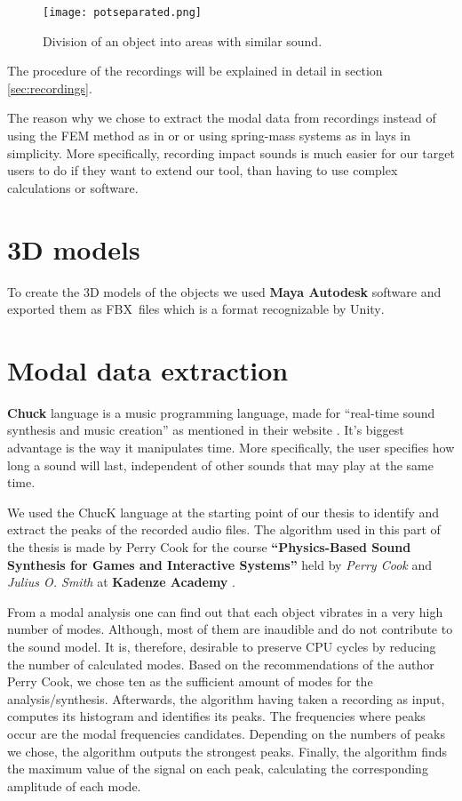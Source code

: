\begin{figure}[H]
  \centering
    \texttt{[image: potseparated.png]}
      \caption{Division of an object into areas with similar sound.}
      \label{fig:pot_sep}
\end{figure} 

The procedure of the recordings will be explained in detail in section \ref{sec:recordings}.

The reason why we chose to extract the modal data from recordings instead of using the FEM method as in \cite{director2001synthesizing} or \cite{o2002synthesizing} or using spring-mass systems as in \cite{raghuvanshi2006interactive} lays in simplicity. More specifically, recording impact sounds is much easier for our target users to do if they want to extend our tool, than having to use complex calculations or software.

\section{3D models}
To create the 3D models of the objects we used \textbf{Maya Autodesk} software \cite{bib:maya} and exported them as FBX\textsuperscript\textregistered\ files \cite{bib:fbx} which is a format recognizable by Unity\textsuperscript{\textregistered}.


\section{Modal data extraction}\label{sec:chuck}
\textbf{Chuck} language is a music programming language, made for ``real-time sound synthesis and music creation'' as mentioned in their website \cite{bib:chuck}. It's biggest advantage is the way it manipulates time. More specifically, the user specifies how long a sound will last, independent of other sounds that may play at the same time.

We used the ChucK language at the starting point of our thesis to identify and extract the peaks of the recorded audio files. The algorithm used in this part of the thesis is made by Perry Cook for the course \textbf{``Physics-Based Sound Synthesis for Games and Interactive Systems''} held by \textit{Perry Cook} and \textit{Julius O. Smith} at \textbf{Kadenze Academy} \cite{bib:physicsbasedcourse}.

From a modal analysis one can find out that each object vibrates in a very high number of modes. Although, most of them are inaudible and do not contribute to the sound model. It is, therefore, desirable to preserve CPU cycles by reducing the number of calculated modes. Based on the recommendations of the author Perry Cook, we chose ten as the sufficient amount of modes for the analysis/synthesis.  Afterwards, the algorithm having taken a recording as input, computes its histogram and identifies its peaks. The frequencies where peaks occur are the modal frequencies candidates. Depending on the numbers of peaks we chose, the algorithm outputs the strongest peaks. Finally, the algorithm finds the maximum value of the signal on each peak, calculating the corresponding amplitude of each mode.


